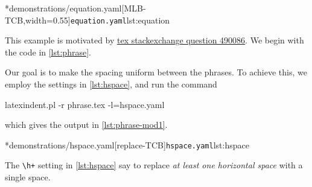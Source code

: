 \begin{example}
		\begin{cmhtcbraster}[
				raster force size=false,
				raster column 1/.style={add to width=-.1\textwidth},
				raster column skip=.06\linewidth]
			\cmhlistingsfromfile*[style=yaml-LST]*{demonstrations/equation.yaml}[MLB-TCB,width=0.55\textwidth]{\texttt{equation.yaml}}{lst:equation}
		\end{cmhtcbraster}
	\end{example}

	\begin{example}
		This example is motivated by \href{https://tex.stackexchange.com/questions/490086/bring-several-lines-together-to-fill-blank-spaces-in-texmaker}{tex stackexchange question 490086}.
		We begin with the code in \cref{lst:phrase}.


		Our goal is to make the spacing uniform between the phrases. To achieve this, we employ the settings in \cref{lst:hspace},
		and run the command
		\begin{commandshell}
latexindent.pl -r phrase.tex -l=hspace.yaml
\end{commandshell}
		which gives the output in \cref{lst:phrase-mod1}.

		\begin{cmhtcbraster}
			\cmhlistingsfromfile*[style=yaml-LST]*{demonstrations/hspace.yaml}[replace-TCB]{\texttt{hspace.yaml}}{lst:hspace}
		\end{cmhtcbraster}

		The \lstinline!\h+! setting in \cref{lst:hspace} say to replace \emph{at least one horizontal space} with a single space.
	\end{example}

